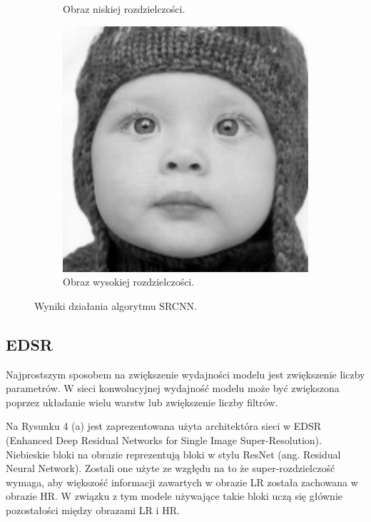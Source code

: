 \documentclass[a4paper,11pt, notitlepage ]{article}
\begin{document}
\begin{figure}[h!]
\begin{subfigure}[b]{0.4\linewidth}
	 		\caption{Obraz  niskiej rozdzielczości.}
	 	\end{subfigure}
	 	\begin{subfigure}[b]{0.4\linewidth}
	 		\includegraphics[width=\linewidth]{SRCNN_15000.png}
	 		\caption{Obraz wysokiej rozdzielczości.}
	 	\end{subfigure}
	 	\caption{Wyniki działania algorytmu SRCNN.}
	 	\label{fig:coffee3}
	 \end{figure}
 \newpage
 \subsection{EDSR}
 Najprostszym sposobem na zwiększenie wydajności modelu jest zwiększenie liczby parametrów. W sieci konwolucyjnej wydajność modelu może być zwiększona poprzez układanie wielu warstw lub zwiększenie liczby filtrów.

 Na Rysunku  4 (a) jest zaprezentowana użyta architektóra sieci w  EDSR (Enhanced Deep Residual Networks for Single Image Super-Resolution). Niebieskie bloki na obrazie reprezentują bloki w stylu  ResNet (ang. Residual Neural Network). Zostali one użyte ze wzgłędu na to że  super-rozdzielczość wymaga, aby większość informacji zawartych w obrazie LR została zachowana w obrazie HR. W związku z tym modele używające takie bloki uczą się głównie pozostałości między obrazami LR i HR.
 
\end{document}
